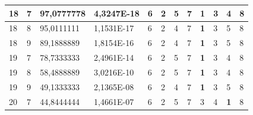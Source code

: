 \documentclass[conference]{IEEEtran}
\begin{document}
\begin{table}[]
\begin{tabular}{|llll|llllllll|}
		\multicolumn{1}{|l|}{18}  & \multicolumn{1}{l|}{7}         & \multicolumn{1}{l|}{97,0777778}    & 4,3247E-18 & \multicolumn{1}{l|}{6}   & \multicolumn{1}{l|}{2}          & \multicolumn{1}{l|}{5}          & \multicolumn{1}{l|}{7}   & \multicolumn{1}{l|}{\textbf{1}} & \multicolumn{1}{l|}{3}          & \multicolumn{1}{l|}{4}          & 8                      \\ \hline
		\multicolumn{1}{|l|}{18}  & \multicolumn{1}{l|}{8}         & \multicolumn{1}{l|}{95,0111111}    & 1,1531E-17 & \multicolumn{1}{l|}{6}   & \multicolumn{1}{l|}{2}          & \multicolumn{1}{l|}{4}          & \multicolumn{1}{l|}{7}   & \multicolumn{1}{l|}{\textbf{1}} & \multicolumn{1}{l|}{3}          & \multicolumn{1}{l|}{5}          & 8                      \\ \hline
		\multicolumn{1}{|l|}{18}  & \multicolumn{1}{l|}{9}         & \multicolumn{1}{l|}{89,1888889}    & 1,8154E-16 & \multicolumn{1}{l|}{6}   & \multicolumn{1}{l|}{2}          & \multicolumn{1}{l|}{4}          & \multicolumn{1}{l|}{7}   & \multicolumn{1}{l|}{\textbf{1}} & \multicolumn{1}{l|}{3}          & \multicolumn{1}{l|}{5}          & 8                      \\ \hline
		\multicolumn{1}{|l|}{19}  & \multicolumn{1}{l|}{7}         & \multicolumn{1}{l|}{78,7333333}    & 2,4961E-14 & \multicolumn{1}{l|}{6}   & \multicolumn{1}{l|}{2}          & \multicolumn{1}{l|}{5}          & \multicolumn{1}{l|}{7}   & \multicolumn{1}{l|}{\textbf{1}} & \multicolumn{1}{l|}{3}          & \multicolumn{1}{l|}{4}          & 8                      \\ \hline
		\multicolumn{1}{|l|}{19}  & \multicolumn{1}{l|}{8}         & \multicolumn{1}{l|}{58,4888889}    & 3,0216E-10 & \multicolumn{1}{l|}{6}   & \multicolumn{1}{l|}{2}          & \multicolumn{1}{l|}{5}          & \multicolumn{1}{l|}{7}   & \multicolumn{1}{l|}{\textbf{1}} & \multicolumn{1}{l|}{3}          & \multicolumn{1}{l|}{4}          & 8                      \\ \hline
		\multicolumn{1}{|l|}{19}  & \multicolumn{1}{l|}{9}         & \multicolumn{1}{l|}{49,1333333}    & 2,1365E-08 & \multicolumn{1}{l|}{6}   & \multicolumn{1}{l|}{2}          & \multicolumn{1}{l|}{4}          & \multicolumn{1}{l|}{7}   & \multicolumn{1}{l|}{\textbf{1}} & \multicolumn{1}{l|}{3}          & \multicolumn{1}{l|}{5}          & 8                      \\ \hline
		\multicolumn{1}{|l|}{20}  & \multicolumn{1}{l|}{7}         & \multicolumn{1}{l|}{44,8444444}    & 1,4661E-07 & \multicolumn{1}{l|}{6}   & \multicolumn{1}{l|}{2}          & \multicolumn{1}{l|}{5}          & \multicolumn{1}{l|}{7}   & \multicolumn{1}{l|}{3}          & \multicolumn{1}{l|}{4}          & \multicolumn{1}{l|}{\textbf{1}} & 8                      \\ \hline

\end{tabular}
\end{table}
\end{document}
